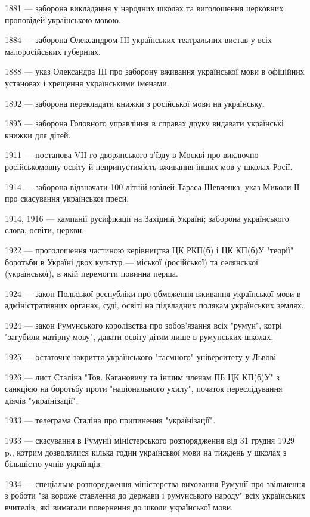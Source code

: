 1881 — заборона викладання у народних школах та виголошення церковних проповідей українською мовою.

1884 — заборона Олександром IIІ українських театральних вистав у всіх малоросійських губерніях.

1888 — указ Олександра IIІ про заборону вживання української мови в офіційних установах і хрещення українськими іменами.

1892 — заборона перекладати книжки з російської мови на українську.

1895 — заборона Головного управління в справах друку видавати українські книжки для дітей.

1911 — постанова VII-го дворянського з'їзду в Москві про виключно російськомовну освіту й неприпустимість вживання інших мов у школах Росії.

1914 — заборона відзначати 100-літній ювілей Тараса Шевченка; указ Миколи ІІ про скасування української преси.

1914, 1916 — кампанії русифікації на Західній Україні; заборона українського слова, освіти, церкви.

1922 — проголошення частиною керівництва ЦК РКП(б) і ЦК КП(б)У "теорії" боротьби в Україні двох культур — міської (російської) та селянської (української), в якій перемогти повинна перша.

1924 — закон Польської республіки про обмеження вживання української мови в адміністративних органах, суді, освіті на підвладних полякам українських землях.

1924 — закон Румунського королівства про зобов'язання всіх "румун", котрі "загубили матірну мову", давати освіту дітям лише в румунських школах.

1925 — остаточне закриття українського "таємного" університету у Львові

1926 — лист Сталіна "Тов. Кагановичу та іншим членам ПБ ЦК КП(б)У" з санкцією на боротьбу проти "національного ухилу", початок переслідування діячів "українізації".

1933 — телеграма Сталіна про припинення "українізації".

1933 — скасування в Румунії міністерського розпорядження від 31 грудня 1929 p., котрим дозволялися кілька годин української мови на тиждень у школах з більшістю учнів-українців.

1934 — спеціальне розпорядження міністерства виховання Румунії про звільнення з роботи "за вороже ставлення до держави і румунського народу" всіх українських вчителів, які вимагали повернення до школи української мови.

